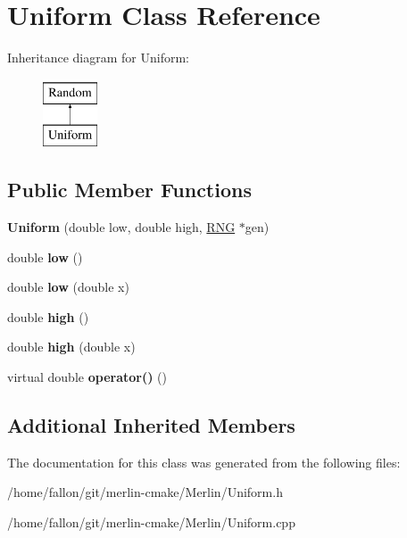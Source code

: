 \hypertarget{classUniform}{}\section{Uniform Class Reference}
\label{classUniform}
Inheritance diagram for Uniform\+:\begin{figure}[H]
\begin{center}
\leavevmode
\includegraphics[height=2.000000cm]{classUniform}
\end{center}
\end{figure}
\subsection*{Public Member Functions}
\begin{DoxyCompactItemize}
\item 
\mbox{\label{classUniform_a63f85ddd7e851bc3e86d06afdf6b59be}} 
{\bfseries Uniform} (double low, double high, \hyperlink{classRNG}{R\+NG} $\ast$gen)
\item 
\mbox{\label{classUniform_a1df7c08e593a698838e999d1116a442f}} 
double {\bfseries low} ()
\item 
\mbox{\label{classUniform_acca6f8498e8f772d0caffae6db028b09}} 
double {\bfseries low} (double x)
\item 
\mbox{\label{classUniform_ab1739d08aad707dcc7eacac1d2a07f52}} 
double {\bfseries high} ()
\item 
\mbox{\label{classUniform_a5ab11d1ed067bd086e19d81345c0cb2f}} 
double {\bfseries high} (double x)
\item 
\mbox{\label{classUniform_a71c26271ddfa286802cea32f1df289a8}} 
virtual double {\bfseries operator()} ()
\end{DoxyCompactItemize}
\subsection*{Additional Inherited Members}


The documentation for this class was generated from the following files\+:\begin{DoxyCompactItemize}
\item 
/home/fallon/git/merlin-\/cmake/\+Merlin/Uniform.\+h\item 
/home/fallon/git/merlin-\/cmake/\+Merlin/Uniform.\+cpp\end{DoxyCompactItemize}
